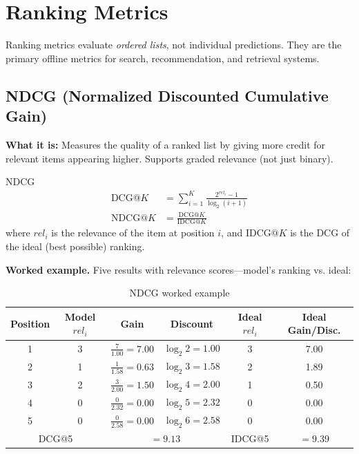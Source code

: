 \section{Ranking Metrics}
\label{sec:ranking_metrics}

Ranking metrics evaluate \textit{ordered lists}, not individual predictions. They are the primary offline metrics for search, recommendation, and retrieval systems.

\subsection{NDCG (Normalized Discounted Cumulative Gain)}

\textbf{What it is:} Measures the quality of a ranked list by giving more credit for relevant items appearing higher. Supports graded relevance (not just binary).

\begin{mathresult}{NDCG}
\begin{align}
\text{DCG}@K &= \sum_{i=1}^{K} \frac{2^{rel_i} - 1}{\log_2(i + 1)} \\[6pt]
\text{NDCG}@K &= \frac{\text{DCG}@K}{\text{IDCG}@K}
\end{align}
where $rel_i$ is the relevance of the item at position $i$, and $\text{IDCG}@K$ is the DCG of the ideal (best possible) ranking.
\end{mathresult}

\textbf{Worked example.} Five results with relevance scores---model's ranking vs. ideal:

\begin{table}[H]
\centering
\caption{NDCG worked example}
\begin{tabular}{cccccc}
\toprule
\textbf{Position} & \textbf{Model $rel_i$} & \textbf{Gain} & \textbf{Discount} & \textbf{Ideal $rel_i$} & \textbf{Ideal Gain/Disc.} \\
\midrule
1 & 3 & $\frac{7}{1.00} = 7.00$ & $\log_2 2 = 1.00$ & 3 & 7.00 \\
2 & 1 & $\frac{1}{1.58} = 0.63$ & $\log_2 3 = 1.58$ & 2 & 1.89 \\
3 & 2 & $\frac{3}{2.00} = 1.50$ & $\log_2 4 = 2.00$ & 1 & 0.50 \\
4 & 0 & $\frac{0}{2.32} = 0.00$ & $\log_2 5 = 2.32$ & 0 & 0.00 \\
5 & 0 & $\frac{0}{2.58} = 0.00$ & $\log_2 6 = 2.58$ & 0 & 0.00 \\
\midrule
\multicolumn{2}{c}{DCG@5} & \multicolumn{2}{c}{$= 9.13$} & IDCG@5 & $= 9.39$ \\
\bottomrule
\end{tabular}
\end{table}

